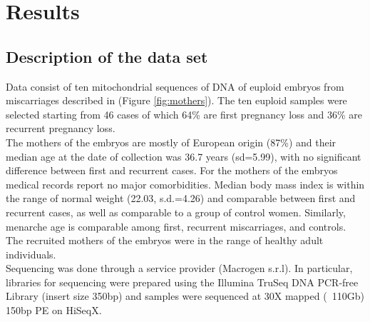 
\chapter{Results}
\section{Description of the data set}
Data consist of ten mitochondrial sequences of DNA of euploid embryos from miscarriages described in \cite{buonaiuto2021prioritization} (Figure \ref{fig:mothers}). The ten euploid samples were selected starting from 46 cases of which 64\% are first pregnancy loss and 36\% are recurrent pregnancy loss.\\ 
The mothers of the embryos are mostly of European origin (87\%) and their median age at the date of collection was 36.7 years (sd=5.99), with no significant difference between first and recurrent cases. For the mothers of the embryos medical records report no major comorbidities. Median body mass index is within the range of normal weight (22.03, s.d.=4.26) and comparable between first and recurrent cases, as well as comparable to a group of control women. Similarly, menarche age is comparable among first, recurrent miscarriages, and controls. The recruited mothers of the embryos were in the range of healthy adult individuals.  \\
Sequencing was done through a service provider (Macrogen s.r.l). In particular, libraries for sequencing were prepared using the Illumina TruSeq DNA PCR-free Library (insert size 350bp) and samples were sequenced at 30X mapped (~110Gb) 150bp PE on HiSeqX. %

